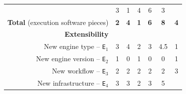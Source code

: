 \documentclass[preprint,3p,twocolumn]{elsarticle}
\begin{document}
\begin{table}
\begin{tabular}{rcccccc}
                                     & \cellcolor[HTML]{99D699}3
                                     & \cellcolor[HTML]{99FF99}1
                                     & \cellcolor[HTML]{99C199}4
                                     & \cellcolor[HTML]{999999}6
                                     & \cellcolor[HTML]{99D699}3\\
  \textbf{Total} (execution software pieces)& \cellcolor[HTML]{99F099}\textbf{2}
                                     & \cellcolor[HTML]{99D399}\textbf{4}
                                     & \cellcolor[HTML]{99FF99}\textbf{1}
                                     & \cellcolor[HTML]{99B699}\textbf{6}
                                     & \cellcolor[HTML]{999999}\textbf{8}
                                     & \cellcolor[HTML]{99D399}\textbf{4}\\
\cellcolor[HTML]{EEEEEE}\textbf{Extensibility}& \multicolumn{6}{l}{\cellcolor[HTML]{EEEEEE}}\\
  New engine type -- \texttt{E$_1$}  & \cellcolor[HTML]{99C499}3
                                     & \cellcolor[HTML]{99A799}4
                                     & \cellcolor[HTML]{99E199}2
                                     & \cellcolor[HTML]{99C499}3
                                     & \cellcolor[HTML]{999999}4.5
                                     & \cellcolor[HTML]{99FF99}1\\
New engine version -- \texttt{E$_2$} & \cellcolor[HTML]{999999}1
                                     & \cellcolor[HTML]{99FF99}0
                                     & \cellcolor[HTML]{999999}1
                                     & \cellcolor[HTML]{99FF99}0
                                     & \cellcolor[HTML]{99FF99}0
                                     & \cellcolor[HTML]{999999}1\\
  New workflow -- \texttt{E$_3$} & \cellcolor[HTML]{99FF99}2
                                     & \cellcolor[HTML]{99FF99}2
                                     & \cellcolor[HTML]{99FF99}2
                                     & \cellcolor[HTML]{99FF99}2
                                     & \cellcolor[HTML]{99FF99}2
                                     & \cellcolor[HTML]{999999}3\\
New infrastructure -- \texttt{E$_4$} & \cellcolor[HTML]{99DD99}3
                                     & \cellcolor[HTML]{99DD99}3
                                     & \cellcolor[HTML]{99FF99}2
                                     & \cellcolor[HTML]{99DD99}3
                                     & \cellcolor[HTML]{999999}5

\end{tabular}
\end{table}
\end{document}
